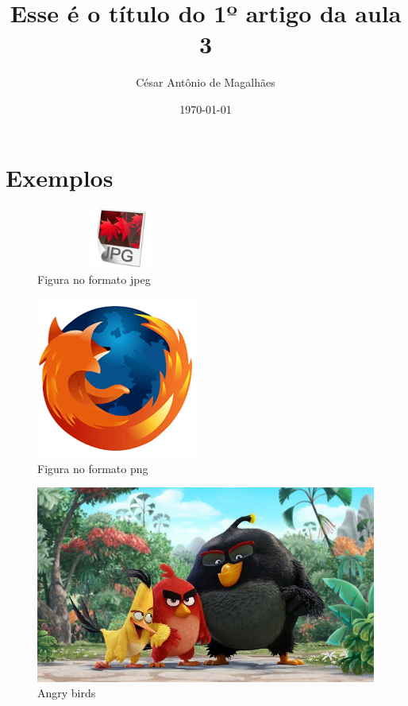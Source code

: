 \documentclass[12pt, a4paper]{article}
\title{Esse é o título do 1º artigo da aula 3}
\author{César Antônio de Magalhães}
\date{\today}
\begin{document}
	\listoffigures
	
	\section{Exemplos}
		\lipsum[1]
	
		\begin{figure}[htbp]
			\centering
			\includegraphics[width=0.5\textwidth, height=2cm, angle=45]{img1.jpg}
			\caption{Figura no formato jpeg	}
		\end{figure}
	
		\lipsum[2]
		
		\begin{figure}[htbp]
			\centering
			\includegraphics[clip, trim= 0 30 0 50]{img2.png}
			\caption{Figura no formato png	}
		\end{figure}
		
		\lipsum[3]
		
		\begin{figure}[hbtp]
			\centering
			\includegraphics[scale=0.4]{img_angry_birds.jpg}
			\caption{Angry birds}
		\end{figure}
		
\end{document}

